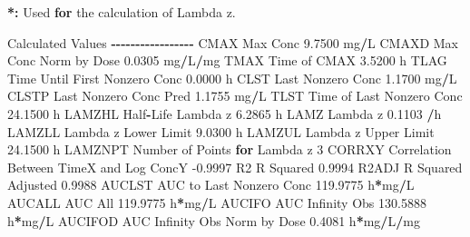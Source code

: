 \documentclass[
  10pt,
]{krantz}
\makeatletter
\newenvironment{Shaded}{\begin{snugshade}}{\end{snugshade}}
\newcommand{\ControlFlowTok}[1]{\textcolor[rgb]{0.13,0.29,0.53}{\textbf{#1}}}
\newcommand{\DecValTok}[1]{\textcolor[rgb]{0.00,0.00,0.81}{#1}}
\newcommand{\ErrorTok}[1]{\textcolor[rgb]{0.64,0.00,0.00}{\textbf{#1}}}
\newcommand{\FloatTok}[1]{\textcolor[rgb]{0.00,0.00,0.81}{#1}}
\newcommand{\NormalTok}[1]{#1}
\newcommand{\OperatorTok}[1]{\textcolor[rgb]{0.81,0.36,0.00}{\textbf{#1}}}
\newcommand{\StringTok}[1]{\textcolor[rgb]{0.31,0.60,0.02}{#1}}
\newenvironment{kframe}{%
\medskip{}
\setlength{\fboxsep}{.8em}
 \def\at@end@of@kframe{}%
 \ifinner\ifhmode%
  \def\at@end@of@kframe{\end{minipage}}%
  \begin{minipage}{\columnwidth}%
 \fi\fi%
 \def\FrameCommand##1{\hskip\@totalleftmargin \hskip-\fboxsep
 \colorbox{shadecolor}{##1}\hskip-\fboxsep
     \hskip-\linewidth \hskip-\@totalleftmargin \hskip\columnwidth}%
 \MakeFramed {\advance\hsize-\width
   \@totalleftmargin\z@ \linewidth\hsize
   \@setminipage}}%
 {\par\unskip\endMakeFramed%
 \at@end@of@kframe}
\renewenvironment{Shaded}{\begin{kframe}}{\end{kframe}}
\makeatother
\begin{document}
\begin{Shaded}
\begin{Highlighting}[]
\OperatorTok{*}\ErrorTok{:}\StringTok{ }\NormalTok{Used }\ControlFlowTok{for}\NormalTok{ the calculation of Lambda z.}


\NormalTok{Calculated Values}
\OperatorTok{{-}{-}{-}{-}{-}{-}{-}{-}{-}{-}{-}{-}{-}{-}{-}{-}{-}}
\NormalTok{CMAX       Max Conc                                        }\FloatTok{9.7500}\NormalTok{ mg}\OperatorTok{/}\NormalTok{L}
\NormalTok{CMAXD      Max Conc Norm by Dose                           }\FloatTok{0.0305}\NormalTok{ mg}\OperatorTok{/}\NormalTok{L}\OperatorTok{/}\NormalTok{mg}
\NormalTok{TMAX       Time of CMAX                                    }\FloatTok{3.5200}\NormalTok{ h}
\NormalTok{TLAG       Time Until First Nonzero Conc                   }\FloatTok{0.0000}\NormalTok{ h}
\NormalTok{CLST       Last Nonzero Conc                               }\FloatTok{1.1700}\NormalTok{ mg}\OperatorTok{/}\NormalTok{L}
\NormalTok{CLSTP      Last Nonzero Conc Pred                          }\FloatTok{1.1755}\NormalTok{ mg}\OperatorTok{/}\NormalTok{L}
\NormalTok{TLST       Time of Last Nonzero Conc                      }\FloatTok{24.1500}\NormalTok{ h}
\NormalTok{LAMZHL     Half}\OperatorTok{{-}}\NormalTok{Life Lambda z                              }\FloatTok{6.2865}\NormalTok{ h}
\NormalTok{LAMZ       Lambda z                                        }\FloatTok{0.1103} \OperatorTok{/}\NormalTok{h}
\NormalTok{LAMZLL     Lambda z Lower Limit                            }\FloatTok{9.0300}\NormalTok{ h}
\NormalTok{LAMZUL     Lambda z Upper Limit                           }\FloatTok{24.1500}\NormalTok{ h}
\NormalTok{LAMZNPT    Number of Points }\ControlFlowTok{for}\NormalTok{ Lambda z                   }\DecValTok{3}
\NormalTok{CORRXY     Correlation Between TimeX and Log ConcY        }\FloatTok{{-}0.9997} 
\NormalTok{R2         R Squared                                       }\FloatTok{0.9994} 
\NormalTok{R2ADJ      R Squared Adjusted                              }\FloatTok{0.9988} 
\NormalTok{AUCLST     AUC to Last Nonzero Conc                      }\FloatTok{119.9775}\NormalTok{ h}\OperatorTok{*}\NormalTok{mg}\OperatorTok{/}\NormalTok{L}
\NormalTok{AUCALL     AUC All                                       }\FloatTok{119.9775}\NormalTok{ h}\OperatorTok{*}\NormalTok{mg}\OperatorTok{/}\NormalTok{L}
\NormalTok{AUCIFO     AUC Infinity Obs                              }\FloatTok{130.5888}\NormalTok{ h}\OperatorTok{*}\NormalTok{mg}\OperatorTok{/}\NormalTok{L}
\NormalTok{AUCIFOD    AUC Infinity Obs Norm by Dose                   }\FloatTok{0.4081}\NormalTok{ h}\OperatorTok{*}\NormalTok{mg}\OperatorTok{/}\NormalTok{L}\OperatorTok{/}\NormalTok{mg}

\end{Highlighting}
\end{Shaded}
\end{document}
